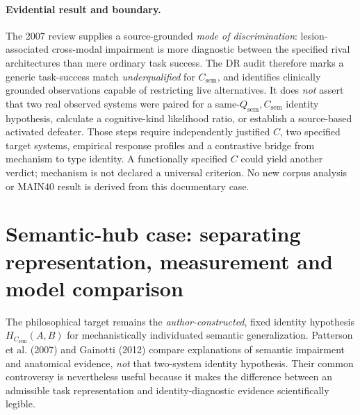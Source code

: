 \documentclass[11pt]{article}
\begin{document}
\paragraph{Evidential result and boundary.}
The 2007 review supplies a source-grounded \emph{mode of discrimination}: lesion-associated cross-modal impairment is more diagnostic between the specified rival architectures than mere ordinary task success. The DR audit therefore marks a generic task-success match \emph{underqualified} for \(C_{\mathrm{sem}}\), and identifies clinically grounded observations capable of restricting live alternatives. It does \emph{not} assert that two real observed systems were paired for a same-\(Q_{\mathrm{sem}},C_{\mathrm{sem}}\) identity hypothesis, calculate a cognitive-kind likelihood ratio, or establish a source-based activated defeater. Those steps require independently justified \(C\), two specified target systems, empirical response profiles and a contrastive bridge from mechanism to type identity. A functionally specified \(C\) could yield another verdict; mechanism is not declared a universal criterion. No new corpus analysis or MAIN40 result is derived from this documentary case.



\section{Semantic-hub case: separating representation, measurement and model comparison}

The philosophical target remains the \emph{author-constructed}, fixed identity hypothesis \(H_{C_{\mathrm{sem}}}(A,B)\) for mechanistically individuated semantic generalization. Patterson et al. (2007) and Gainotti (2012) compare explanations of semantic impairment and anatomical evidence, \emph{not} that two-system identity hypothesis. Their common controversy is nevertheless useful because it makes the difference between an admissible task representation and identity-diagnostic evidence scientifically legible.
\end{document}
